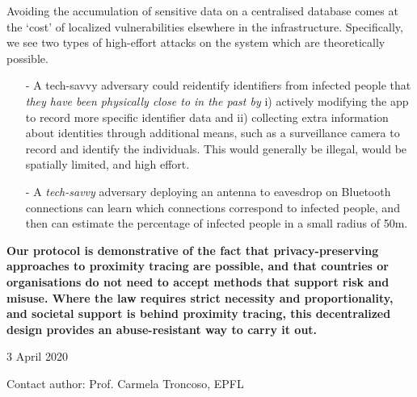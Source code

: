 \documentclass[12pt,a4paper]{article}
\begin{document}
Avoiding the accumulation of sensitive data on a centralised database comes at the ‘cost’ of localized vulnerabilities elsewhere in the infrastructure. Specifically, we see two types of high-effort attacks on the system which are theoretically possible.
\begin{itemize}\itemsep0pt
\item[-] A tech-savvy adversary could reidentify identifiers from infected people that \textit{they have been physically close to in the past by} i) actively modifying the app to record more specific identifier data and ii) collecting extra information about identities through additional means, such as a surveillance camera to record and identify the individuals. This would generally be illegal, would be spatially limited, and high effort.
\item[-] A \textit{tech-savvy} adversary deploying an antenna to eavesdrop on Bluetooth
connections can learn which connections correspond to infected people, and then
can estimate the percentage of infected people in a small radius of 50m.
\end{itemize}
\textbf{Our protocol is demonstrative of the fact that privacy-preserving approaches to
proximity tracing are possible, and that countries or organisations do not need to
accept methods that support risk and misuse. Where the law requires strict necessity
and proportionality, and societal support is behind proximity tracing, this
decentralized design provides an abuse-resistant way to carry it out.}\\
\begin{flushright}
3 April 2020


Contact author: Prof. Carmela Troncoso, EPFL
\end{flushright}
\end{document}
